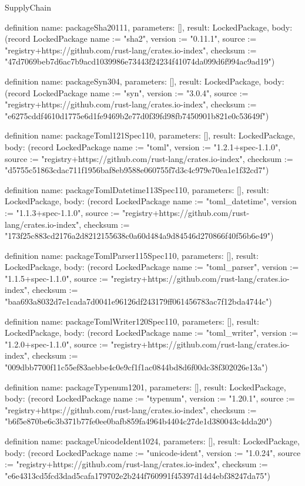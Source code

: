 \begin{lexlean}{SupplyChain}
\begin{semanticmodule}
definition{
  name: packageSha20111,
  parameters: [],
  result: LockedPackage,
  body: (record LockedPackage {name := "sha2", version := "0.11.1", source := "registry+https://github.com/rust-lang/crates.io-index", checksum := "47d7069beb7d6ac7b9acd1039986e73443f24234f41074da099d6f994ac9ad19"})
}

definition{
  name: packageSyn304,
  parameters: [],
  result: LockedPackage,
  body: (record LockedPackage {name := "syn", version := "3.0.4", source := "registry+https://github.com/rust-lang/crates.io-index", checksum := "e6275cddf4610d1775e6d1fe9469b2e77d0f39fd98fb7450901b821e0c53649f"})
}

definition{
  name: packageToml121Spec110,
  parameters: [],
  result: LockedPackage,
  body: (record LockedPackage {name := "toml", version := "1.2.1+spec-1.1.0", source := "registry+https://github.com/rust-lang/crates.io-index", checksum := "d5755c51863cdac711f1956baf8eb9588e060755f7d3c4c979e70ea1e1f32cd7"})
}

definition{
  name: packageTomlDatetime113Spec110,
  parameters: [],
  result: LockedPackage,
  body: (record LockedPackage {name := "toml_datetime", version := "1.1.3+spec-1.1.0", source := "registry+https://github.com/rust-lang/crates.io-index", checksum := "173f25c883cd2176a2d8212155638c0a60d484a9d84546d270866f40f56b6e49"})
}

definition{
  name: packageTomlParser115Spec110,
  parameters: [],
  result: LockedPackage,
  body: (record LockedPackage {name := "toml_parser", version := "1.1.5+spec-1.1.0", source := "registry+https://github.com/rust-lang/crates.io-index", checksum := "baa693a8032d7e1cada7d0041e96126df243179ff061456783ac7f12bda4744c"})
}

definition{
  name: packageTomlWriter120Spec110,
  parameters: [],
  result: LockedPackage,
  body: (record LockedPackage {name := "toml_writer", version := "1.2.0+spec-1.1.0", source := "registry+https://github.com/rust-lang/crates.io-index", checksum := "009dbb7700f11c55ef83aebbe4c0e9cf1f1ac0844bd8d6f00dc38f302026e13a"})
}

definition{
  name: packageTypenum1201,
  parameters: [],
  result: LockedPackage,
  body: (record LockedPackage {name := "typenum", version := "1.20.1", source := "registry+https://github.com/rust-lang/crates.io-index", checksum := "b6f5e870be6c3b371b77fe0ee0bafb859fa4964b4404c27de1d380043c4dda20"})
}

definition{
  name: packageUnicodeIdent1024,
  parameters: [],
  result: LockedPackage,
  body: (record LockedPackage {name := "unicode-ident", version := "1.0.24", source := "registry+https://github.com/rust-lang/crates.io-index", checksum := "e6e4313cd5fcd3dad5cafa179702e2b244f760991f45397d14d4ebf38247da75"})
}


\end{semanticmodule}
\end{lexlean}

